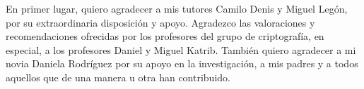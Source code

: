 \begin{acknowledgements}
En primer lugar, quiero agradecer a mis tutores Camilo Denis y Miguel Leg\'on, por su extraordinaria disposici\'on y apoyo. Agradezco las valoraciones y recomendaciones ofrecidas por los profesores del grupo de criptograf\'ia, en especial, a los profesores Daniel y Miguel Katrib. Tambi\'en quiero agradecer a mi novia Daniela Rodr\'iguez por su apoyo en la investigaci\'on, a mis padres y a todos aquellos que de una manera u otra han contribuido.
\end{acknowledgements}
